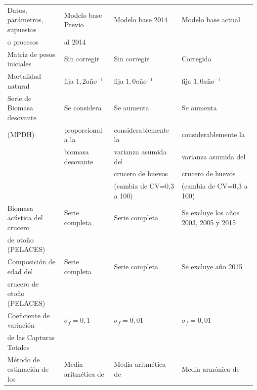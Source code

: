 \documentclass[
  spanish,
]{article}
\begin{document}
\begin{table}[h]
  \centering
  \resizebox{16cm}{!} {
  \begin{tabular}{|l|l|l|l|}
  \hline
 Datos, parámetros, supuestos  & Modelo base Previo          & Modelo base 2014            & Modelo base actual \\ 
 o procesos                    & al 2014                     &                             & \\ \hline
 Matriz de pesos iniciales     & Sin corregir                & Sin corregir                & Corregida         \\ \hline
 Mortalidad natural            & fija  $1,2 año^{-1}$        & fija $1,0 año^{-1}$         & fija  $1,0 año^{-1}$ \\ \hline
 Serie de Biomasa desovante    & Se considera                & Se aumenta                  & Se aumenta \\
 (MPDH)                        & proporcional a la           & considerablemente la        & considerablemente la \\
                               &  biomasa desovante          & varianza asumida del        & varianza asumida del \\
                               &                             & crucero de huevos           & crucero de huevos \\
                               &                             & (cambia de CV=0,3 a 100)    & (cambia de CV=0,3 a 100) \\ \hline
 Biomasa acústica del crucero  & Serie completa              & Serie completa              & Se excluye los años 2003, 2005 y 2015\\ 
 de otoño (PELACES)            &                             &                             &  \\ \hline
 Composición de edad del       & Serie completa              & Serie completa              & Se excluye año 2015 \\
 crucero de otoño (PELACES)    &                             &                             & \\ \hline
 Coeficiente de variación      & $\sigma_f=0,1$              & $\sigma_f=0,01$             & $\sigma_f=0,01$           \\
 de las Capturas Totales       &                             &                             & \\ \hline
 Método de estimación de los   & Media aritmética de         & Media aritmética de         &    Media armónica de \\

\end{tabular}}
\end{table}
\end{document}
